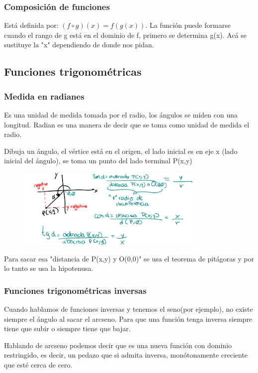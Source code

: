 \documentclass[letterpaper,12pt]{article}
\begin{document}
\begin{sloppypar}
\subsubsection*{Composición de funciones}
Está definida por: $(f \circ g)(x) = f(g(x))$. La función puede formarse cuando el rango de g está en el dominio de f, primero se determina g(x). Acá se sustituye la "x" dependiendo de donde nos pidan.
\subsection{Funciones trigonométricas}
\subsubsection*{Medida en radianes}
Es una unidad de medida tomada por el radio, los ángulos se miden con una longitud. Radian es una manera de decir que se toma como unidad de medida el radio. 

Dibuja un ángulo, el vértice está en el origen, el lado inicial es en eje x (lado inicial del ángulo), se toma un punto del lado terminal P(x,y)
\begin{figure}[H]
    \centering
    \includegraphics[width=0.8\textwidth]{images/trig2.PNG}
\end{figure}
Para sacar esa "distancia de P(x,y) y O(0,0)" se usa el teorema de pitágoras y por lo tanto se usa la hipotenusa.

\subsubsection*{Funciones trigonométricas inversas}
Cuando hablamos de funciones inversas y tenemos el seno(por ejemplo), no existe siempre el ángulo al sacar el arcseno. Para que una función tenga inversa siempre tiene que subir o siempre tiene que bajar.

Hablando de arcseno podemos decir que es una nueva función con dominio restringido, es decir, un pedazo que si admita inversa, monótonamente creciente que esté cerca de cero.


\end{sloppypar}
\end{document}
